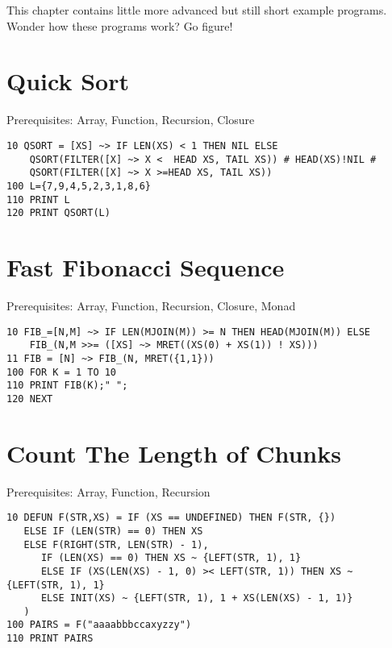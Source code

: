 This chapter contains little more advanced but still short example programs. Wonder how these programs work? Go figure!

\section{Quick Sort}

Prerequisites: Array, Function, Recursion, Closure

\begin{lstlisting}
10 QSORT = [XS] ~> IF LEN(XS) < 1 THEN NIL ELSE 
    QSORT(FILTER([X] ~> X <  HEAD XS, TAIL XS)) # HEAD(XS)!NIL # 
    QSORT(FILTER([X] ~> X >=HEAD XS, TAIL XS))
100 L={7,9,4,5,2,3,1,8,6}
110 PRINT L
120 PRINT QSORT(L)
\end{lstlisting}

\section{Fast Fibonacci Sequence}

Prerequisites: Array, Function, Recursion, Closure, Monad

\begin{lstlisting}
10 FIB_=[N,M] ~> IF LEN(MJOIN(M)) >= N THEN HEAD(MJOIN(M)) ELSE
    FIB_(N,M >>= ([XS] ~> MRET((XS(0) + XS(1)) ! XS)))
11 FIB = [N] ~> FIB_(N, MRET({1,1}))
100 FOR K = 1 TO 10
110 PRINT FIB(K);" ";
120 NEXT
\end{lstlisting}

\section{Count The Length of Chunks}

Prerequisites: Array, Function, Recursion

\begin{lstlisting}
10 DEFUN F(STR,XS) = IF (XS == UNDEFINED) THEN F(STR, {})
   ELSE IF (LEN(STR) == 0) THEN XS
   ELSE F(RIGHT(STR, LEN(STR) - 1),
      IF (LEN(XS) == 0) THEN XS ~ {LEFT(STR, 1), 1}
      ELSE IF (XS(LEN(XS) - 1, 0) >< LEFT(STR, 1)) THEN XS ~ {LEFT(STR, 1), 1}
      ELSE INIT(XS) ~ {LEFT(STR, 1), 1 + XS(LEN(XS) - 1, 1)}
   )
100 PAIRS = F("aaaabbbccaxyzzy")
110 PRINT PAIRS
\end{lstlisting}
